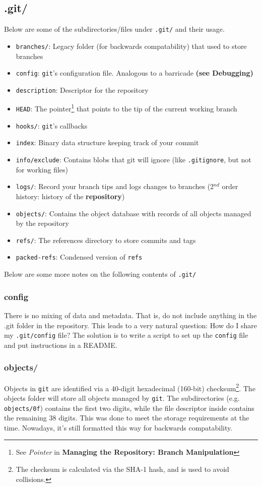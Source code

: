 \documentclass[13pt]{article}
\begin{document}
\subsection{.git/}
Below are some of the subdirectories/files under \texttt{.git/} and their usage.
\begin{itemize}[label=\texttt{.git/}]
\item \texttt{branches/}: Legacy folder (for backwards compatability) that used to store branches
\item \texttt{config}: \texttt{git}'s configuration file. Analogous to a barricade \textbf{(see Debugging)}
\item \texttt{description}: Descriptor for the repository
\item \texttt{HEAD}: The pointer\footnote{See \textit{Pointer} in \textbf{Managing the Repository: Branch Manipulation}} that points to the tip of the current working branch
\item \texttt{hooks/}: \texttt{git}'s callbacks
\item \texttt{index}: Binary data structure keeping track of your commit
\item \texttt{info/exclude}: Contains blobs that git will ignore (like \texttt{.gitignore}, but not for working files)
\item \texttt{logs/}: Record your branch tips and logs changes to branches (2$^{nd}$ order history: history of the \textbf{repository})
\item \texttt{objects/}: Contains the object database with records of all objects managed by the repository
\item \texttt{refs/}: The references directory to store commits and tags
\item \texttt{packed-refs}: Condensed version of \texttt{refs}
\end{itemize}
Below are some more notes on the following contents of \texttt{.git/}

\subsubsection*{config}
There is no mixing of data and metadata. That is, do not include anything in the .git folder in the repository. This leads to a very natural question: How do I share my \texttt{.git/config} file? The solution is to write a script to set up the \texttt{config} file and put instructions in a README.

\subsubsection*{objects/}
Objects in \texttt{git} are identified via a 40-digit hexadecimal (160-bit) checksum\footnote{The checksum is calculated via the SHA-1 hash, and is used to avoid collisions.}. The objects folder will store all objects managed by \texttt{git}. The subdirectories (e.g. \texttt{objects/0f}) contains the first two digits, while the file descriptor inside contains the remaining 38 digits. This was done to meet the storage requirements at the time. Nowadays, it's still formatted this way for backwards compatability.
\end{document}
